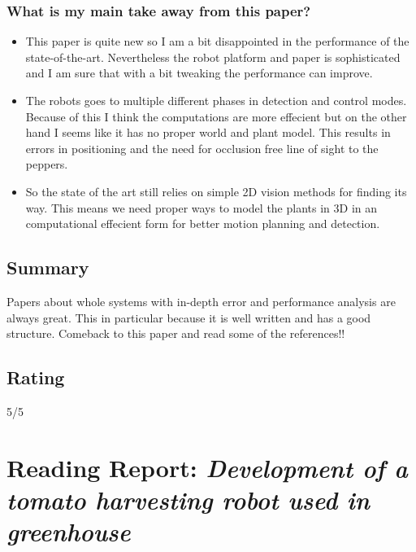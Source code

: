     \subsubsection*{What is my main take away from this paper?}
    \begin{itemize}
        \item This paper is quite new so I am a bit disappointed in the performance of the state-of-the-art.
        Nevertheless the robot platform and paper is sophisticated and I am sure that with a bit tweaking the performance can improve.
        \item The robots goes to multiple different phases in detection and control modes. Because of this I think the 
        computations are more effecient but on the other hand I seems like it has no proper world and plant model. 
        This results in errors in positioning and the need for occlusion free line of sight to the peppers. 
        \item So the state of the art still relies on simple 2D vision methods for finding its way.  
        This means we need proper ways to model the plants in 3D in an computational effecient form for better motion planning and detection.
    \end{itemize}
    
    \subsection*{Summary}
    Papers about whole systems with in-depth error and performance analysis are always great. This in particular because it is well written and has a good structure. 
    Comeback to this paper and read some of the references!!
    
    \subsection*{Rating}
    5/5
    
    \newpage
    \section{Reading Report: \emph{Development of a tomato harvesting robot used in greenhouse}}
    \cite{Lili2017}
    

